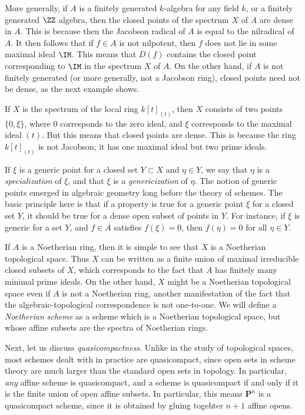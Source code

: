More generally, if $A$ is a finitely generated $k$-algebra for any field $k$, or a finitely generated $\ZZ$ algebra, then the closed points of the spectrum $X$ of $A$ are dense in $A$. This is because then the Jacobson radical of $A$ is equal to the nilradical of $A$. It then follows that if $f \in A$ is not nilpotent, then $f$ does not lie in some maximal ideal $\IM$. This means that $D(f)$ contains the closed point corresponding to $\IM$ in the spectrum $X$ of $A$. On the other hand, if $A$ is not finitely generated (or more generally, not a Jacobson ring), closed points need not be dense, as the next example shows.

\begin{example}
    If $X$ is the spectrum of the local ring $k[t]_{(t)}$, then $X$ consists of two points $\{ 0, \xi \}$, where $0$ corresponds to the zero ideal, and $\xi$ corresponds to the maximal ideal $(t)$. But this means that closed points are dense. This is because the ring $k[t]_{(t)}$ is not Jacobson; it has one maximal ideal but two prime ideals.
\end{example}

If $\xi$ is a generic point for a closed set $Y \subset X$ and $\eta \in Y$, we say that $\eta$ is a \emph{specialization} of $\xi$, and that $\xi$ is a \emph{genericization} of $\eta$. The notion of generic points emerged in algebraic geometry long before the theory of schemes. The basic principle here is that if a property is true for a generic point $\xi$ for a closed set $Y$, it should be true for a dense open subset of points in $Y$. For instance, if $\xi$ is generic for a set $Y$, and $f \in A$ satisfies $f(\xi) = 0$, then $f(\eta) = 0$ for all $\eta \in Y$.

If $A$ is a Noetherian ring, then it is simple to see that $X$ is a Noetherian topological space. Thus $X$ can be written as a finite union of maximal irreducible closed subsets of $X$, which corresponds to the fact that $A$ has finitely many minimal prime ideals. On the other hand, $X$ might be a Noetherian topological space even if $A$ is not a Noetherian ring, another manifestation of the fact that the algebraic-topological correspondence is not one-to-one. We will define a \emph{Noetherian scheme} as a scheme which is a Noetherian topological space, but whose affine subsets are the spectra of Noetherian rings.

Next, let us discuss \emph{quasicompactness}. Unlike in the study of topological spaces, most schemes dealt with in practice are quasicompact, since open sets in scheme theory are much larger than the standard open sets in topology. In particular, \emph{any} affine scheme is quasicompact, and a scheme is quasicompact if and only if it is the finite union of open affine subsets. In particular, this means $\mathbf{P}^n$ is a quasicompact scheme, since it is obtained by gluing togehter $n+1$ affine opens.


